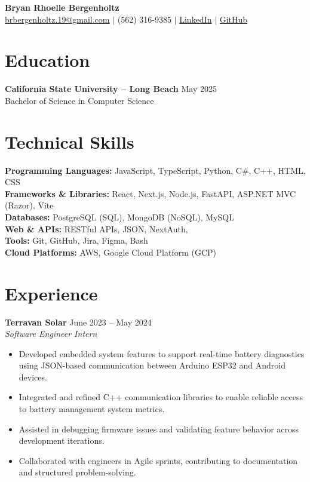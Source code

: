 \documentclass[a4paper,9.5pt]{article}
\newcommand{\dateright}[1]{\hfill {\small\textnormal{#1}}}
\begin{document}

\begin{center}
  {\LARGE \textbf{Bryan Rhoelle Bergenholtz}}\\[-1pt]
  \href{mailto:brbergenholtz.19@gmail.com}{brbergenholtz.19@gmail.com} $|$
  (562) 316-9385 $|$
  \href{https://linkedin.com/in/bryanbergenholtz}{LinkedIn} $|$
  \href{https://github.com/YanRho}{GitHub}
\end{center}

\section*{Education}
\textbf{California State University – Long Beach} \dateright{May 2025}\\
Bachelor of Science in Computer Science

\section*{Technical Skills}
\textbf{Programming Languages:} JavaScript, TypeScript, Python, C\#, C++, HTML, CSS \\
\textbf{Frameworks \& Libraries:} React, Next.js, Node.js, FastAPI, ASP.NET MVC (Razor), Vite \\
\textbf{Databases:} PostgreSQL (SQL), MongoDB (NoSQL), MySQL \\
\textbf{Web \& APIs:} RESTful APIs, JSON, NextAuth, \\
\textbf{Tools:} Git, GitHub, Jira, Figma, Bash \\
\textbf{Cloud Platforms:} AWS, Google Cloud Platform (GCP)

\section*{Experience}

\textbf{Terravan Solar} \dateright{June 2023 – May 2024}\\
\textit{Software Engineer Intern}
\begin{itemize}
  \item Developed embedded system features to support real-time battery diagnostics using JSON-based communication between Arduino ESP32 and Android devices.
  \item Integrated and refined C++ communication libraries to enable reliable access to battery management system metrics.
  \item Assisted in debugging firmware issues and validating feature behavior across development iterations.
  \item Collaborated with engineers in Agile sprints, contributing to documentation and structured problem-solving.
\end{itemize}
\end{document}
